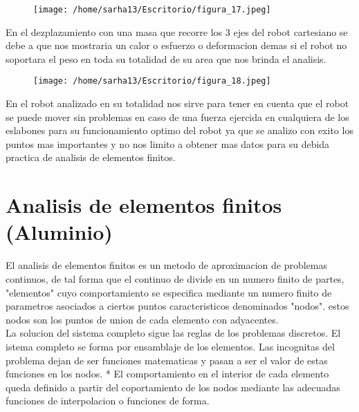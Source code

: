 \documentclass[letter,openright,12pt,spanish]{report}
\begin{document}
\begin{figure}[htp!]
\centering
\texttt{[image: /home/sarha13/Escritorio/figura\_17.jpeg]}
\caption{}
\label{Figura 7.}
\end{figure}

En el dezplazamiento con una masa que recorre los 3 ejes del robot cartesiano se debe a que nos mostraria un calor o esfuerzo o deformacion demas si el robot no soportara el peso en toda su totalidad de su area que nos brinda el analisis.

\begin{figure}[htp!]
\centering
\texttt{[image: /home/sarha13/Escritorio/figura\_18.jpeg]}
\caption{}
\label{Figura 7.}
\end{figure}

En el robot analizado en su totalidad nos sirve para tener en cuenta que el robot se puede mover sin problemas en caso de una fuerza ejercida en cualquiera de los eslabones para su funcionamiento optimo del robot ya que se analizo con exito los puntos mas importantes  y no nos limito a obtener mas datos para su debida practica de analisis de elementos finitos.

\section{Analisis de elementos finitos (Aluminio)}
El analisis de elementos finitos es un metodo de aproximacion de problemas continuos, de tal forma que el continuo de divide en un numero finito de partes, "elementos" cuyo comportamiento se especifica mediante un numero finito de parametros asociados a ciertos puntos caracteristicos denominados "nodos". estos nodos son los puntos de union de cada elemento con adyacentes.\\
La solucion del sistema completo sigue las reglas de los problemas discretos. El istema completo se forma por ensamblaje de los elementos. Las incognitas del problema dejan de ser funciones matematicas y pasan a ser el valor de estas funciones en los nodos.
* El comportamiento en el interior de cada elemento queda definido a partir del coportamiento de los nodos mediante las adecuadas funciones de interpolacion o funciones de forma.
\end{document}

